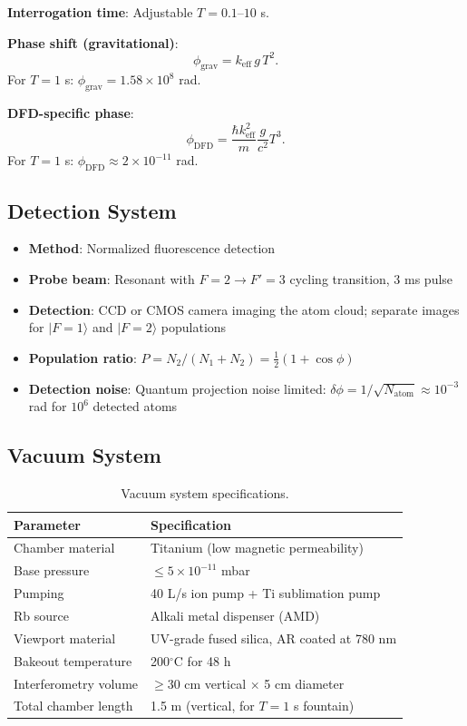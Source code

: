 \documentclass[12pt,a4paper]{article}
\begin{document}
\textbf{Interrogation time}: Adjustable $T = 0.1$--$10$ s.

\textbf{Phase shift (gravitational)}:
\begin{equation}
\phi_{\text{grav}} = k_{\text{eff}}\,g\,T^2.
\end{equation}
For $T = 1$ s: $\phi_{\text{grav}} = 1.58 \times 10^8$ rad.

\textbf{DFD-specific phase}:
\begin{equation}
\phi_{\text{DFD}} = \frac{\hbar k_{\text{eff}}^2}{m}\frac{g}{c^2}T^3.
\end{equation}
For $T = 1$ s: $\phi_{\text{DFD}} \approx 2 \times 10^{-11}$ rad.

\subsection{Detection System}

\begin{itemize}
\item \textbf{Method}: Normalized fluorescence detection
\item \textbf{Probe beam}: Resonant with $F=2 \to F'=3$ cycling
transition, 3 ms pulse
\item \textbf{Detection}: CCD or CMOS camera imaging the atom cloud;
separate images for $|F=1\rangle$ and $|F=2\rangle$ populations
\item \textbf{Population ratio}:
$P = N_2/(N_1 + N_2) = \frac{1}{2}(1 + \cos\phi)$
\item \textbf{Detection noise}: Quantum projection noise limited:
$\delta\phi = 1/\sqrt{N_{\text{atom}}} \approx 10^{-3}$ rad for
$10^6$ detected atoms
\end{itemize}

\subsection{Vacuum System}

\begin{table}[H]
\centering
\begin{tabular}{ll}
\toprule
\textbf{Parameter} & \textbf{Specification} \\
\midrule
Chamber material & Titanium (low magnetic permeability) \\
Base pressure & $\leq 5 \times 10^{-11}$ mbar \\
Pumping & 40 L/s ion pump + Ti sublimation pump \\
Rb source & Alkali metal dispenser (AMD) \\
Viewport material & UV-grade fused silica, AR coated at 780 nm \\
Bakeout temperature & 200$^\circ$C for 48 h \\
Interferometry volume & $\geq 30$ cm vertical $\times$ 5 cm diameter \\
Total chamber length & 1.5 m (vertical, for $T = 1$ s fountain) \\
\bottomrule
\end{tabular}
\caption{Vacuum system specifications.}
\end{table}
\end{document}
